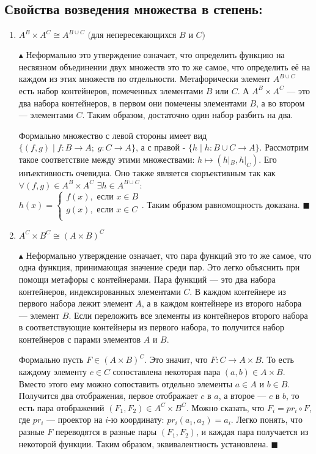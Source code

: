 \subsection*{Свойства возведения множества в степень:}
\begin{enumerate}
    \item $A^B \times A^C \cong A^{B \cup C} \mbox{ (для непересекающихся $B$ и $C$)}$
    \par $\blacktriangle$ Неформально это утверждение означает, что определить функцию на несвязном объединении двух множеств это то же самое, что определить её на каждом из этих множеств по отдельности. Метафорически элемент $A^{B \cup C}$ есть набор контейнеров, помеченных элементами $B$ или $C$. А $A^B \times A^C$ — это два набора контейнеров, в первом они помечены элементами $B$, а во втором — элементами $C$. Таким образом, достаточно один набор разбить на два. \par Формально множество с левой стороны имеет вид $\{ (f, g)\; | \; f: B \rightarrow A;\; g: C \rightarrow A \}$, а с правой - $\{h \;|\;h: B \cup C \rightarrow A \}$. Рассмотрим такое соответствие между этими множествами: $h \longmapsto (h|_B, h|_C)$. Его инъективность очевидна. Оно также является сюръективным так как $\forall (f, g) \in A^B \times A^C$ \;
    $\exists h \in A^{B \cup C}:$ 
    \\
    $h(x) = \left\{
\begin{array}{ccc}
f(x), \mbox{ если } x \in B\\
g(x), \mbox{ если } x \in C\\
\end{array}
\right. $. Таким образом равномощность доказана.
    $\blacksquare$
    \item $A^C \times B^C \cong (A \times B)^C$
    \par $\blacktriangle$ Неформально утверждение означает, что пара функций это то же самое, что одна функция, принимающая значение среди пар. Это легко объяснить при помощи метафоры с контейнерами. Пара функций — это два набора контейнеров, индексированных элементами $C$. В каждом контейнере из первого набора лежит элемент $A$, а в каждом контейнере из второго набора — элемент $B$. Если переложить все элементы из контейнеров второго набора в соответствующие контейнеры из первого набора, то получится набор контейнеров с парами элементов $A$ и $B$. 
    \par Формально пусть $F \in (A \times B)^C$. Это значит, что $F : C \rightarrow A \times B$. То есть каждому элементу $c \in C$ сопоставлена некоторая пара $(a, b) \in A \times B$. Вместо этого ему можно сопоставить отдельно элементы $a \in A$ и $b \in B$. Получится два отображения, первое отображает $c$ в $a$, а второе — $c$ в $b$, то есть пара отображений $(F_1, F_2) \in A^C \times B^C$. Можно сказать, что $F_i = pr_i \circ F$, где $pr_i$ — проектор на $i$-ю координату: $pr_i(a_1, a_2) = a_i$. Легко понять, что разные $F$ переводятся в разные пары $(F_1, F_2)$, и каждая пара получается из некоторой функции. Таким образом, эквивалентность установлена. $\blacksquare$

\end{enumerate}

